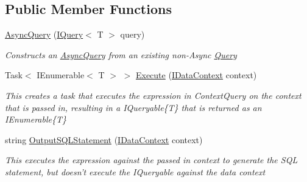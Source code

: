 \subsection*{Public Member Functions}
\begin{DoxyCompactItemize}
\item 
\hyperlink{class_highway_1_1_data_1_1_query_objects_1_1_async_query-g_a8ededa42a1fa185fb1d639d6dcc285e6}{Async\-Query} (\hyperlink{interface_highway_1_1_data_1_1_interfaces_1_1_i_query-g}{I\-Query}$<$ T $>$ query)
\begin{DoxyCompactList}\small\item\em Constructs an \hyperlink{class_highway_1_1_data_1_1_query_objects_1_1_async_query-g}{Async\-Query} from an existing non-\/\-Async \hyperlink{class_highway_1_1_data_1_1_query_objects_1_1_query-g}{Query} \end{DoxyCompactList}\item 
Task$<$ I\-Enumerable$<$ T $>$ $>$ \hyperlink{class_highway_1_1_data_1_1_query_objects_1_1_async_query-g_a1f616c1d4c33dbeefdcfc435fff96931}{Execute} (\hyperlink{interface_highway_1_1_data_1_1_interfaces_1_1_i_data_context}{I\-Data\-Context} context)
\begin{DoxyCompactList}\small\item\em This creates a task that executes the expression in Context\-Query on the context that is passed in, resulting in a I\-Queryable\{\-T\} that is returned as an I\-Enumerable\{\-T\} \end{DoxyCompactList}\item 
string \hyperlink{class_highway_1_1_data_1_1_query_objects_1_1_async_query-g_a9bd874775719c724859e294bfb6ea4cc}{Output\-S\-Q\-L\-Statement} (\hyperlink{interface_highway_1_1_data_1_1_interfaces_1_1_i_data_context}{I\-Data\-Context} context)
\begin{DoxyCompactList}\small\item\em This executes the expression against the passed in context to generate the S\-Q\-L statement, but doesn't execute the I\-Queryable against the data context \end{DoxyCompactList}\end{DoxyCompactItemize}


